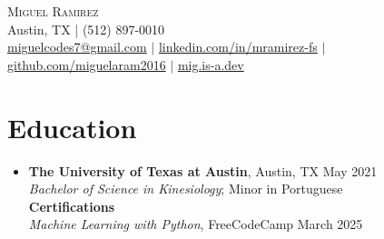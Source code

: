 \documentclass[letterpaper,10pt]{article}
\begin{document}

\begin{center}
  {\Large \scshape Miguel Ramirez} \\ \vspace{0pt}
  Austin, TX | (512) 897-0010 \\ 
  \href{mailto:miguelcodes7@gmail.com}{miguelcodes7@gmail.com} $|$
  \href{https://linkedin.com/in/mramirez-fs}{linkedin.com/in/mramirez-fs} $|$
  \href{https://github.com/miguelaram2016}{github.com/miguelaram2016} $|$
  \href{https://mig.is-a.dev}{mig.is-a.dev}
\end{center}

\section*{Education}
\begin{itemize}[leftmargin=0in]
  \item[]
    \textbf{The University of Texas at Austin}, Austin, TX \hfill May 2021 \\
    \textit{Bachelor of Science in Kinesiology}; Minor in Portuguese \\
    \textbf{Certifications} \\
    \textit{Machine Learning with Python}, FreeCodeCamp \hfill March 2025 
\end{itemize}

\end{document}
